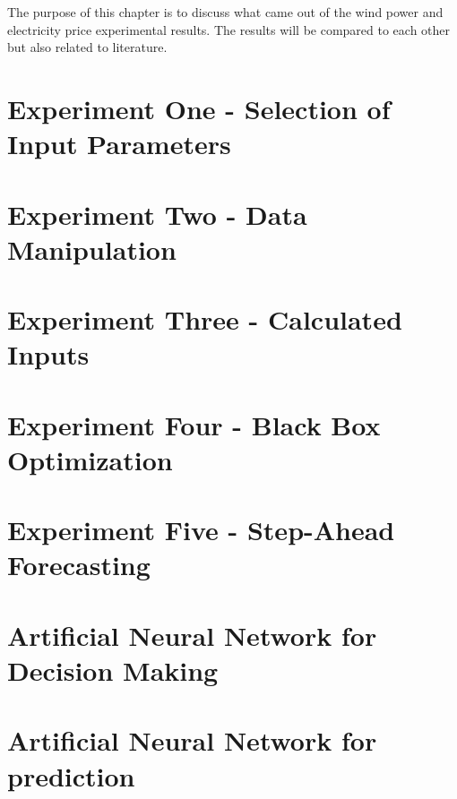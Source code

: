 The purpose of this chapter is to discuss what came out of the wind power and electricity price experimental results. The results will be compared to each other but also related to literature.

\section{Experiment One - Selection of Input Parameters}
\label{sec:inputParameterDiscussion}

\newpage

\section{Experiment Two - Data Manipulation}
\label{sec:matrixTrimmingDiscussion}


\newpage
\section{Experiment Three - Calculated Inputs}
\label{sec:calculatedInputDiscussion}


\newpage
\section{Experiment Four - Black Box Optimization}
\label{sec:blackBoxDiscussion}


\newpage
\section{Experiment Five - Step-Ahead Forecasting}
\label{sec:stepAheadForecastingDiscussion}


\newpage
\section{Artificial Neural Network for Decision Making}
\label{sec:annForDecisionMaking}


\newpage
\section{Artificial Neural Network for prediction}
\label{sec:annForPrediction}
